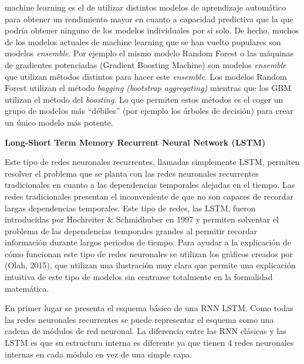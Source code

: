 \documentclass[]{DissertateUSU}
\begin{document}
\begin{enumerate}
  machine learning es el de utilizar distintos modelos de aprendizaje
  automático para obtener un rendimiento mayor en cuanto a capacidad
  predictiva que la que podría obtener ninguno de los modelos
  individuales por si solo. De hecho, muchos de los modelos actuales de
  machine learning que se han vuelto populares son modelos
  \emph{ensemble}. Por ejemplo el mismo modelo Random Forest o las
  máquinas de gradientes potenciadas (Gradient Boosting Machine) son
  modelos \emph{ensemble} que utilizan métodos distintos para hacer este
  \emph{ensemble}. Los modelos Random Forest utilizan el método
  \emph{bagging (bootstrap aggregating)} mientras que los GBM utilizan
  el método del \emph{boosting}. Lo que permiten estos métodos es el
  coger un grupo de modelos más ``débiles'' (por ejemplo los árboles de
  decisión) para crear un único modelo más potente.
\end{enumerate}

\setlength\parskip{5ex}

\textbf{Long-Short Term Memory Recurrent Neural Network (LSTM)}

\noindent Este tipo de redes neuronales recurrentes, llamadas
simplemente LSTM, permiten resolver el problema que se planta con las
redes neuronales recurrentes tradicionales en cuanto a las dependencias
temporales alejadas en el tiempo. Las redes tradicionales presentan el
inconveniente de que no son capaces de recordar largas dependencias
temporales. Este tipo de redes, las LSTM, fueron introducidas por
Hochreiter \& Schmidhuber en 1997 y permiten solventar el problema de
las dependencias temporales grandes al permitir recordar información
durante largos periodos de tiempo. Para ayudar a la explicación de cómo
funcionan este tipo de redes neuronales se utilizan los gráficos creados
por (Olah, 2015), que utilizan una ilustración muy clara que permite una
explicación intuitiva de este tipo de modelos sin centrarse totalmente
en la formalidad matemática.

\noindent En primer lugar se presenta el esquema básico de una RNN LSTM.
Como todas las redes neuronales recurrentes se puede representar el
esquema como una cadena de módulos de red neuronal. La diferencia entre
las RNN clásicas y las LSTM es que su estructura interna es diferente ya
que tienen 4 redes neuronales internas en cada módulo en vez de una
simple capa.
\end{document}
